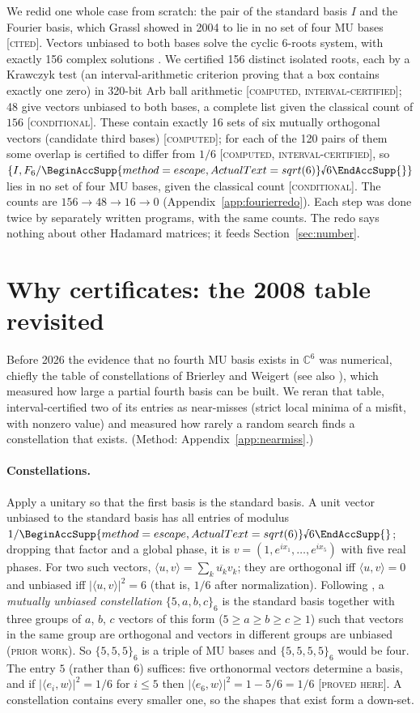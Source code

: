 \documentclass[11pt]{article}
\newcommand{\rnum}[1]{\BeginAccSupp{method=escape,ActualText=sqrt(#1)}\text{\textsurd}#1\EndAccSupp{}}
\newcommand{\rsix}{\rnum{6}}
\newcommand{\C}{\mathbb{C}}
\newcommand{\ip}[2]{\langle #1,#2\rangle}
\newcommand{\abs}[1]{\lvert #1\rvert}
\newcommand{\st}[1]{\textsc{[#1]}}
\newcommand{\stproved}{\st{proved here}}
\newcommand{\stcert}{\st{computed, interval-certified}}
\newcommand{\stcomp}{\st{computed}}
\newcommand{\stcited}{\st{cited}}
\newcommand{\stcond}{\st{conditional}}
\newcommand{\prior}{\textsc{(prior work)}}
\theoremstyle{definition}
\theoremstyle{remark}
\begin{document}
We redid one whole case from scratch: the pair of the standard basis $I$ and the Fourier basis, which Grassl
showed in 2004 to lie in no set of four MU bases \cite{Grassl} \stcited. Vectors unbiased to both bases solve the cyclic
6-roots system, with exactly 156 complex solutions \cite{BF91}. We certified 156 distinct isolated roots, each by a
Krawczyk test (an interval-arithmetic criterion proving that a box contains exactly one zero) in 320-bit Arb ball
arithmetic \stcert; 48 give vectors unbiased to both bases, a complete list given the classical count of $156$
\stcond. These contain exactly 16 sets of six mutually orthogonal vectors (candidate third bases) \stcomp; for each of the
120 pairs of them some overlap is certified to differ from $1/6$ \stcert, so $\{I,F_6/\rsix\}$ lies in no set of four MU
bases, given the classical count \stcond. The counts are $156\to48\to16\to0$ (Appendix~\ref{app:fourierredo}). Each step was done twice by separately written
programs, with the same counts. The redo says nothing about other Hadamard matrices; it feeds Section~\ref{sec:number}.

\section{Why certificates: the 2008 table revisited}\label{sec:const}

\noindent Before 2026 the evidence that no fourth MU basis exists in $\C^6$ was numerical, chiefly the table of
constellations of Brierley and Weigert \cite{BW08} (see also \cite{BW09}), which measured how large a partial fourth
basis can be built. We reran that table, interval-certified two of its entries as near-misses (strict local
minima of a misfit, with nonzero value) and measured how rarely a random search finds a constellation that exists. (Method:
Appendix~\ref{app:nearmiss}.)

\paragraph{Constellations.} Apply a unitary so that the first basis is the standard basis. A unit vector unbiased to the
standard basis has all entries of modulus $1/\rsix$; dropping that factor and a global phase, it is
$v=(1,e^{ix_1},\dots,e^{ix_5})$ with five real phases. For two such vectors, $\ip uv=\sum_k\overline{u_k}v_k$; they are
orthogonal iff $\ip uv=0$ and unbiased iff $\abs{\ip uv}^2=6$ (that is, $1/6$ after normalization). Following
\cite{BW08}, a \emph{mutually unbiased constellation} $\{5,a,b,c\}_6$ is the standard basis together with three groups
of $a$, $b$, $c$ vectors of this form ($5\ge a\ge b\ge c\ge1$) such that vectors in the same group are orthogonal and
vectors in different groups are unbiased \prior. So $\{5,5,5\}_6$ is a triple of MU bases and $\{5,5,5,5\}_6$ would be four. The entry $5$ (rather than $6$) suffices: five orthonormal vectors determine a basis, and if
$\abs{\ip{e_i}{w}}^2=1/6$ for $i\le5$ then $\abs{\ip{e_6}{w}}^2=1-5/6=1/6$ \stproved. A constellation contains every smaller
one, so the shapes that exist form a down-set.
\end{document}
